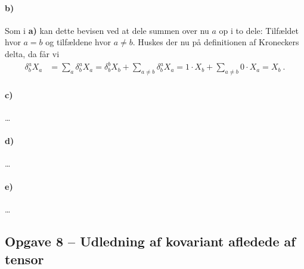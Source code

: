 \documentclass[../main.tex]{subfiles}
\begin{document}

\paragraph{b)}

Som i \textbf{a)} kan dette bevisen ved at dele summen over nu $a$ op i to dele: Tilfældet hvor $a = b$ og tilfældene hvor $a \ne b$. Huskes der nu på definitionen af Kroneckers delta, da får vi
\begin{align}
    \delta^a_b X_a &= \sum_a \delta^a_b X_a
        = \delta^b_b X_b + \sum_{a \ne b} \delta^a_b X_a
        = 1 \cdot X_b + \sum_{a \ne b} 0 \cdot X_a
        = X_b \: .
\end{align}



\paragraph{c)}

\ldots




\paragraph{d)}

\ldots



\paragraph{e)}

\ldots




\subsection{Opgave 8 -- Udledning af kovariant afledede af tensor}
\setcounter{subsection}{8}
\setcounter{equation}{0}
\end{document}
